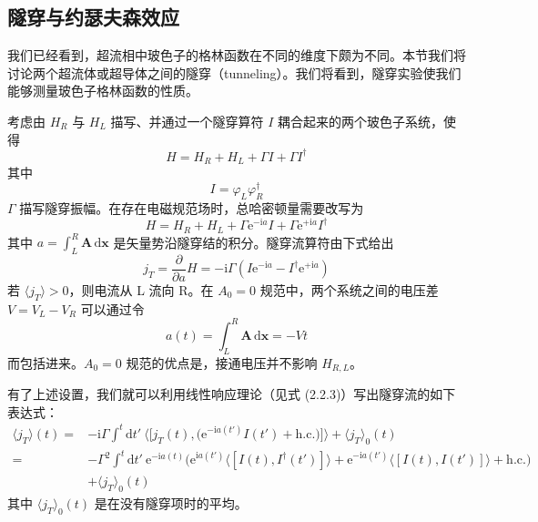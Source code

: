 \subsection{隧穿与约瑟夫森效应}

我们已经看到，超流相中玻色子的格林函数在不同的维度下颇为不同。本节我们将讨论两个超流体或超导体之间的隧穿（tunneling）。我们将看到，隧穿实验使我们能够测量玻色子格林函数的性质。

考虑由 $H_{R}$ 与 $H_{L}$ 描写、并通过一个隧穿算符 $I$ 耦合起来的两个玻色子系统，使得
\begin{equation*}
H = H_{R} + H_{L} + \Gamma I + \Gamma I^{\dagger}
\end{equation*}
其中
\begin{equation*}
I = \varphi_{L}\varphi_{R}^{\dagger}
\end{equation*}
$\Gamma$ 描写隧穿振幅。在存在电磁规范场时，总哈密顿量需要改写为
\begin{equation*}
H = H_{R} + H_{L} + \Gamma\mathrm{e}^{-\mathrm{i}a}I + \Gamma\mathrm{e}^{+\mathrm{i}a}I^{\dagger}
\end{equation*}
其中 $a=\int_{L}^{R}\pmb{A}\,\mathrm{d}\pmb{x}$ 是矢量势沿隧穿结的积分。隧穿流算符由下式给出
\begin{equation*}
j_{T} = \frac{\partial}{\partial a}H = -\mathrm{i}\Gamma\left(I\mathrm{e}^{-\mathrm{i}a} - I^{\dagger}\mathrm{e}^{+\mathrm{i}a}\right)
\end{equation*}
若 $\langle j_{T}\rangle>0$，则电流从 L 流向 R。在 $A_{0}=0$ 规范中，两个系统之间的电压差 $V=V_{L}-V_{R}$ 可以通过令
\begin{equation*}
a(t) = \int_{L}^{R}\pmb{A}\,\mathrm{d}\pmb{x} = -Vt
\end{equation*}
而包括进来。$A_{0}=0$ 规范的优点是，接通电压并不影响 $H_{R,L}$。

有了上述设置，我们就可以利用线性响应理论（见式 (2.2.3)）写出隧穿流的如下表达式：
\begin{align*}
\langle j_{T}\rangle(t) ={}& -\mathrm{i}\Gamma\int^{t}\mathrm{d}t'\ \Big\langle\big[j_{T}(t), \big(\mathrm{e}^{-\mathrm{i}a(t')}I(t') + \text{h.c.}\big)\big]\Big\rangle + \langle j_{T}\rangle_{0}(t)\\
={}& -\Gamma^{2}\int^{t}\mathrm{d}t'\ \mathrm{e}^{-\mathrm{i}a(t)}\Big(\mathrm{e}^{\mathrm{i}a(t')}\big\langle[I(t), I^{\dagger}(t')]\big\rangle + \mathrm{e}^{-\mathrm{i}a(t')}\big\langle[I(t), I(t')]\big\rangle + \text{h.c.}\Big)\\
& + \langle j_{T}\rangle_{0}(t)
\end{align*}
其中 $\langle j_{T}\rangle_{0}(t)$ 是在没有隧穿项时的平均。

